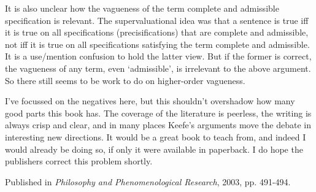 \documentclass[
  10pt,
  letterpaper,
  DIV=11,
  numbers=noendperiod,
  twoside]{scrartcl}
\begin{document}
It is also unclear how the vagueness of the term complete and admissible
specification is relevant. The supervaluational idea was that a sentence
is true iff it is true on all specifications (precisifications) that are
complete and admissible, not iff it is true on all specifications
satisfying the term complete and admissible. It is a use/mention
confusion to hold the latter view. But if the former is correct, the
vagueness of any term, even `admissible', is irrelevant to the above
argument. So there still seems to be work to do on higher-order
vagueness.

I've focussed on the negatives here, but this shouldn't overshadow how
many good parts this book has. The coverage of the literature is
peerless, the writing is always crisp and clear, and in many places
Keefe's arguments move the debate in interesting new directions. It
would be a great book to teach from, and indeed I would already be doing
so, if only it were available in paperback. I do hope the publishers
correct this problem shortly.

\vspace{1cm}



\noindent Published in\emph{
Philosophy and Phenomenological Research}, 2003, pp. 491-494.
\end{document}
